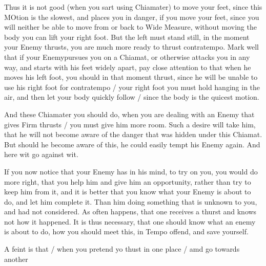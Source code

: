 Thus it is not good (when you sart using Chiamater) to move your feet,
since this MOtion is the slowest, and places you in danger, if you
move your feet, since you will neither be able to move from or back to
Wide Measure, without moving the body you can lift your right
foot. But the left must stand still, in the moment your Enemy thrusts,
you are much more ready to thrust contratempo. Mark well that if your
Enemypursues you on a Chiamat, or otherwise attacks you in any way, and
starts with his feet widely apart, pay close attention to that when he
moves his left foot, you should in that moment thrust, since he will
be unable to use his right foot for contratempo / your right foot you
must hold hanging in the air, and then let
your body quickly follow / since the body is the quicest motion.


And these Chiamater you should do, when you are dealing with an Enemy
that gives Firm thrusts / you must give him more room. Such a desire
will take him, that he will not become aware of the danger that was
hidden under this Chiamat. But should he become aware of this, he could
easily tempt his Enemy again. And here wit go against wit.


If you now notice that your Enemy has in his mind, to try on you, you
would do more right, that you help him and give him an opportunity,
rather than try to keep him from it, and it is better that you know
what your Enemy is about to do, and let him complete it. Than him
doing something that is unknown to you, and had not considered. As
often happens, that one receives a thurst and knows not how it
happened. It is thus necessary, that one should know what an enemy is
about to do, how you should meet this, in Tempo offend, and save yourself.



A feint is that / when you pretend yo thust in one place / amd go
towards another
